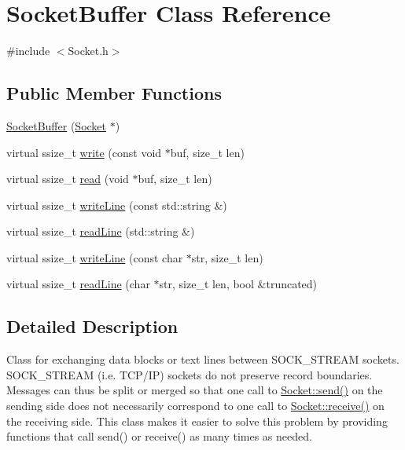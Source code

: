 \hypertarget{classSocketBuffer}{\section{Socket\-Buffer Class Reference}
\label{classSocketBuffer}
}


{\ttfamily \#include $<$Socket.\-h$>$}

\subsection*{Public Member Functions}
\begin{DoxyCompactItemize}
\item 
\hyperlink{classSocketBuffer_ad726b4173f7bb35a76f45ce4efb87cb7}{Socket\-Buffer} (\hyperlink{classSocket}{Socket} $\ast$)
\item 
virtual ssize\-\_\-t \hyperlink{classSocketBuffer_a26cf495283bfd370bd0c1f1503aa3a23}{write} (const void $\ast$buf, size\-\_\-t len)
\item 
virtual ssize\-\_\-t \hyperlink{classSocketBuffer_a8e5c92d79ded209859fcebe263ec562a}{read} (void $\ast$buf, size\-\_\-t len)
\item 
virtual ssize\-\_\-t \hyperlink{classSocketBuffer_aac837dee402bd3e1c3b9743296077788}{write\-Line} (const std\-::string \&)
\item 
virtual ssize\-\_\-t \hyperlink{classSocketBuffer_ac20bf5c29b46baa4bbb313d3685464e0}{read\-Line} (std\-::string \&)
\item 
virtual ssize\-\_\-t \hyperlink{classSocketBuffer_a893d29a2deb893cdd54ccc76a9ecb7ee}{write\-Line} (const char $\ast$str, size\-\_\-t len)
\item 
virtual ssize\-\_\-t \hyperlink{classSocketBuffer_aa376d145f76d0868beccd29cb033c745}{read\-Line} (char $\ast$str, size\-\_\-t len, bool \&truncated)
\end{DoxyCompactItemize}


\subsection{Detailed Description}
Class for exchanging data blocks or text lines between S\-O\-C\-K\-\_\-\-S\-T\-R\-E\-A\-M sockets. S\-O\-C\-K\-\_\-\-S\-T\-R\-E\-A\-M (i.\-e. T\-C\-P/\-I\-P) sockets do not preserve record boundaries. Messages can thus be split or merged so that one call to \hyperlink{classSocket_a9275eacdb64056a53cf4b9cf54cd2f1a}{Socket\-::send()} on the sending side does not necessarily correspond to one call to \hyperlink{classSocket_aa5e98b6f2c4e26fcf90d71c8386fc09d}{Socket\-::receive()} on the receiving side. This class makes it easier to solve this problem by providing functions that call send() or receive() as many times as needed. 

